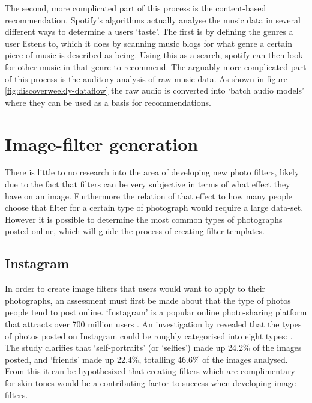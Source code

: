 \documentclass[a4paper,12pt]{report}
\begin{document}
        The second, more complicated part of this process is the content-based recommendation. Spotify's algorithms actually analyse the music data in several different ways to determine a users ‘taste’. The first is by defining the genres a user listens to, which it does by scanning music blogs for what genre a certain piece of music is described as being. Using this as a search, spotify can then look for other music in that genre to recommend. The arguably more complicated part of this process is the auditory analysis of raw music data. As shown in figure \ref{fig:discoverweekly-dataflow} the raw audio is converted into ‘batch audio models’ where they can be used as a basis for recommendations.


  \section{Image-filter generation}
    There is little to no research into the area of developing new photo filters, likely due to the fact that filters can be very subjective in terms of what effect they have on an image. Furthermore the relation of that effect to how many people choose that filter for a certain type of photograph would require a large data-set. However it is possible to determine the most common types of photographs posted online, which will guide the process of creating filter templates.

    \subsection{Instagram} \label{sec:lit-insta}
      In order to create image filters that users would want to apply to their photographs, an assessment must first be made about that the type of photos people tend to post online. ‘Instagram’ is a popular online photo-sharing platform that attracts over 700 million users \citep{instagram2017users}. An investigation by \cite{hu2014we} revealed that the types of photos posted on Instagram could be roughly categorised into eight types: . The study clarifies that ‘self-portraits’ (or ‘selfies’) made up 24.2\% of the images posted, and ‘friends’ made up 22.4\%, totalling 46.6\% of the images analysed. From this it can be hypothesized that creating filters which are complimentary for skin-tones would be a contributing factor to success when developing image-filters.
\end{document}
